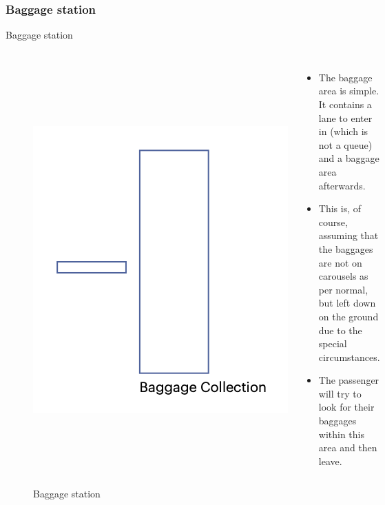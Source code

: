 \documentclass{beamer}
\begin{document}
\subsubsection{Baggage station}
\begin{frame}{Baggage station}
	\begin{figure}
		
		\begin{columns}
			\includegraphics[scale=0.6]{../img/baggage}
			\caption{Baggage station}
			\begin{itemize}
				\item The baggage area is simple. It contains a lane to enter in (which is not a queue) and a baggage area afterwards. 
				\item This is, of course, assuming that the baggages are not on carousels as per normal, but left down on the ground due to the special circumstances. 
				\item The passenger will try to look for their baggages within this area and then leave.
			\end{itemize}
		\end{columns}
	\end{figure}
\end{frame}
\end{document}
